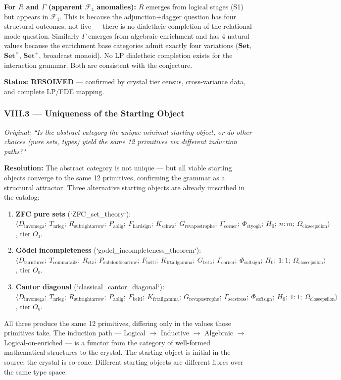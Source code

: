 \documentclass[12pt,a4paper]{article}
\begin{document}
\textbf{For $R$ and $\Gamma$ (apparent $\mathcal{F}_4$ anomalies):} $R$ emerges from logical stages (S1) but appears in $\mathcal{F}_4$. This is because the adjunction+dagger question has four structural outcomes, not five --- there is no dialetheic completion of the relational mode question. Similarly $\Gamma$ emerges from algebraic enrichment and has 4 natural values because the enrichment base categories admit exactly four variations ($\mathbf{Set}$, $\mathbf{Set}^\times$, $\mathbf{Set}^+$, broadcast monoid). No LP dialetheic completion exists for the interaction grammar. Both are consistent with the conjecture.

\textbf{Status: RESOLVED} --- confirmed by crystal tier census, cross-variance data, and complete LP/FDE mapping.

\subsubsection{VIII.3 --- Uniqueness of the Starting Object}
\emph{Original: ``Is the abstract category the unique minimal starting object, or do other choices (pure sets, types) yield the same 12 primitives via different induction paths?"}

\textbf{Resolution:} The abstract category is not unique --- but all viable starting objects converge to the same 12 primitives, confirming the grammar as a structural attractor. Three alternative starting objects are already imscribed in the catalog:
\begin{enumerate}
\item \textbf{ZFC pure sets} (`ZFC\_set\_theory`): $\langle D_{\text{invomega}};\ T_{\text{nrleg}};\ R_{\text{subrightarrow}};\ P_{\text{aolig}};\ F_{\text{hardsign}};\ K_{\text{schwa}};\ G_{\text{revapostrophe}};\ \Gamma_{\text{corner}};\ \Phi_{\text{ctyogh}};\ H_0;\ n{:}m;\ \Omega_{\text{closeepsilon}} \rangle$, tier $O₁$.
\item \textbf{G\"odel incompleteness} (`godel\_incompleteness\_theorem`): $\langle D_{\text{turnthree}};\ T_{\text{commatailz}};\ R_{\text{ctz}};\ P_{\text{subdoublearrow}};\ F_{\text{beltl}};\ K_{\text{frtailgamma}};\ G_{\text{beta}};\ \Gamma_{\text{corner}};\ \Phi_{\text{softsign}};\ H_0;\ 1{:}1;\ \Omega_{\text{closeepsilon}} \rangle$, tier $O₀$.
\item \textbf{Cantor diagonal} (`classical\_cantor\_diagonal`): $\langle D_{\text{invomega}};\ T_{\text{nrleg}};\ R_{\text{subrightarrow}};\ P_{\text{aolig}};\ F_{\text{beltl}};\ K_{\text{frtailgamma}};\ G_{\text{revapostrophe}};\ \Gamma_{\text{secstress}};\ \Phi_{\text{softsign}};\ H_0;\ 1{:}1;\ \Omega_{\text{closeepsilon}} \rangle$, tier $O₀$.
\end{enumerate}
All three produce the same 12 primitives, differing only in the values those primitives take. The induction path --- Logical $\to$ Inductive $\to$ Algebraic $\to$ Logical-on-enriched --- is a functor from the category of well-formed mathematical structures to the crystal. The starting object is initial in the source; the crystal is co-cone. Different starting objects are different fibres over the same type space.
\end{document}
